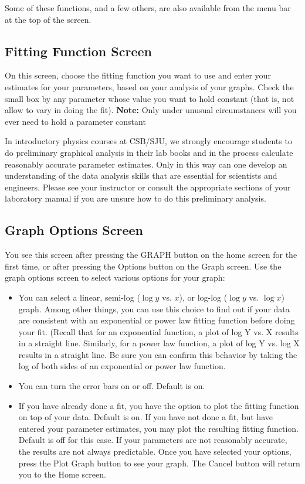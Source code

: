 Some of these functions, and a few others, are also available from the
menu bar at the top of the screen.

\subsection*{Fitting Function Screen}

On this screen, choose the fitting function you want to use and enter
your estimates for your parameters, based on your analysis of your
graphs. Check the small box by any
parameter whose value you want to hold constant (that is, not allow to
vary in doing the fit).  {\bf Note:  }Only under unusual
circumstances will you ever need to hold a parameter constant

In introductory physics courses at CSB/SJU, we strongly encourage
students to do preliminary graphical analysis in their lab books and
in the process calculate reasonably accurate parameter estimates.
Only in this way can one develop an understanding of the data analysis
skills that are essential for scientists and engineers.  Please see
your instructor or consult the appropriate sections of your laboratory
manual if you are unsure how to do this preliminary analysis.

\subsection*{Graph Options Screen}

You see this screen after pressing the GRAPH button on the home screen
for the first time, or after pressing the Options button on the Graph
screen. Use the graph options screen to select various options for
your graph:

\begin{itemize}
\item You can select a linear, semi-log ($\log y$ vs. $x$), or log-log
($\log y$
vs. $\log x$) graph.  Among other things, you can use this choice to
find out
if your data are consistent with an exponential or power law fitting function before doing your fit.  (Recall that for an exponential function, a plot of log Y vs. X results in a straight line.  Similarly, for a power law function, a plot of log Y vs. log X results in a straight line.
Be sure you can confirm this behavior by taking the log of both sides of an exponential or power law function.
%
\item You can turn the error bars on or off.  Default is on.
%
\item If you have already done a fit, you have the option to plot
the
fitting function on top of your data.  Default is on.
If you have not done a fit, but have entered your parameter estimates, you may plot the resulting fitting function.  Default is off for this case.  If your parameters are not reasonably accurate, the results are not always predictable.
Once you have selected your options, press the Plot Graph button to see your graph.  The Cancel button will return you to the Home screen.
\end{itemize}

